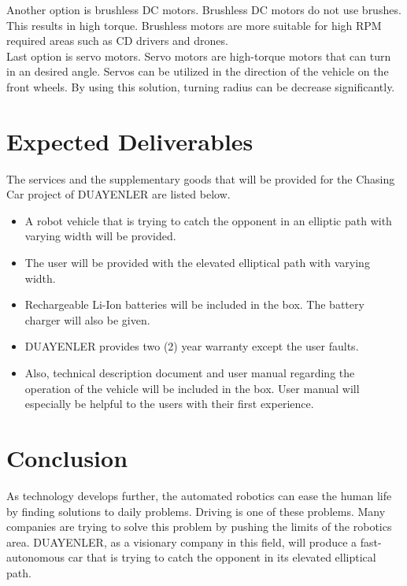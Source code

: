 \documentclass[a4paper,12pt]{article}
\begin{document}
Another option is brushless DC motors. Brushless DC motors do not use brushes. This results in high torque. Brushless motors are more suitable for high RPM required areas such as CD drivers and drones.\\

Last option is servo motors. Servo motors are high-torque motors that can turn in an desired angle. Servos can be utilized in the direction of the vehicle on the front wheels. By using this solution, turning radius can be decrease significantly.\\

\section{Expected Deliverables}

The services and the supplementary goods that will be provided for the Chasing Car project of DUAYENLER are listed below.
\begin{itemize}
	\item A robot vehicle that is trying to catch the opponent in an elliptic path with varying width will be provided.
	\item The user will be provided with the elevated elliptical path with varying width.
	\item Rechargeable Li-Ion batteries will be included in the box. The battery charger will also be given.
	\item DUAYENLER provides two (2) year warranty except the user faults.
	\item Also, technical description document and user  manual regarding the operation of the vehicle will be included in the box. User manual will especially be helpful to the users with their first experience.
\end{itemize} 

\newpage

\section{Conclusion}
As technology develops further, the automated robotics can ease the human life by finding solutions to daily problems. Driving is one of these problems. Many companies are trying to solve this problem by pushing the limits of the robotics area. DUAYENLER, as a visionary company in this field, will produce a fast-autonomous car that is trying to catch the opponent in its elevated elliptical path.\\
\end{document}
